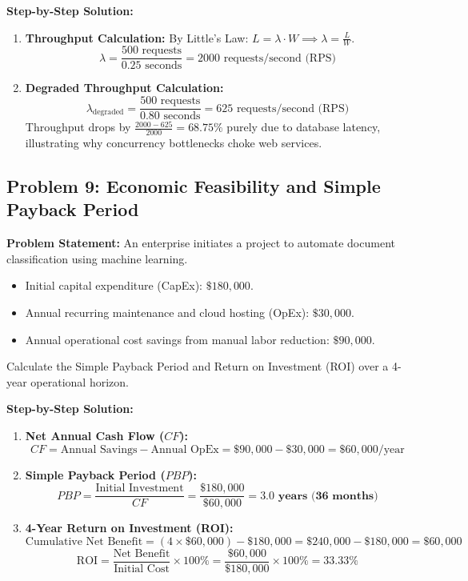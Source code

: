 \textbf{Step-by-Step Solution:}
\begin{enumerate}[label=(\alph*)]
    \item \textbf{Throughput Calculation:}
    By Little's Law: $L = \lambda \cdot W \implies \lambda = \frac{L}{W}$.
    \[
    \lambda = \frac{500\text{ requests}}{0.25\text{ seconds}} = 2000\text{ requests/second (RPS)}
    \]
    \item \textbf{Degraded Throughput Calculation:}
    \[
    \lambda_{\text{degraded}} = \frac{500\text{ requests}}{0.80\text{ seconds}} = 625\text{ requests/second (RPS)}
    \]
    Throughput drops by $\frac{2000 - 625}{2000} = 68.75\%$ purely due to database latency, illustrating why concurrency bottlenecks choke web services.
\end{enumerate}

\subsection*{Problem 9: Economic Feasibility and Simple Payback Period}
\textbf{Problem Statement:} An enterprise initiates a project to automate document classification using machine learning.
\begin{itemize}
    \item Initial capital expenditure (CapEx): $\$180,000$.
    \item Annual recurring maintenance and cloud hosting (OpEx): $\$30,000$.
    \item Annual operational cost savings from manual labor reduction: $\$90,000$.
\end{itemize}
Calculate the Simple Payback Period and Return on Investment (ROI) over a 4-year operational horizon.

\textbf{Step-by-Step Solution:}
\begin{enumerate}[label=\arabic*.]
    \item \textbf{Net Annual Cash Flow ($CF$):}
    \[
    CF = \text{Annual Savings} - \text{Annual OpEx} = \$90,000 - \$30,000 = \$60,000/\text{year}
    \]
    \item \textbf{Simple Payback Period ($PBP$):}
    \[
    PBP = \frac{\text{Initial Investment}}{CF} = \frac{\$180,000}{\$60,000} = \mathbf{3.0\text{ years (36 months)}}
    \]
    \item \textbf{4-Year Return on Investment (ROI):}
    \[
    \text{Cumulative Net Benefit} = (4 \times \$60,000) - \$180,000 = \$240,000 - \$180,000 = \$60,000
    \]
    \[
    \text{ROI} = \frac{\text{Net Benefit}}{\text{Initial Cost}} \times 100\% = \frac{\$60,000}{\$180,000} \times 100\% = \mathbf{33.33\%}
    \]
\end{enumerate}

